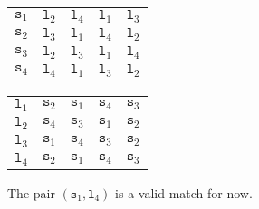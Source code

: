 \documentclass[a4paper, openany]{memoir}
\begin{document}
    \begin{table}[H]
        \centering
        \begin{subtable}{0.45\textwidth}
            \centering
            \begin{tabular}{c|cccc}
                $\texttt{s}_1$ & {\color{blue!60} $\texttt{l}_2$} & \underline{$\texttt{l}_4$} & $\texttt{l}_1$ & $\texttt{l}_3$ \\
                $\texttt{s}_2$ & \underline{$\texttt{l}_3$} & $\texttt{l}_1$ & $\texttt{l}_4$ & $\texttt{l}_2$ \\
                $\texttt{s}_3$ & \underline{$\texttt{l}_2$} & $\texttt{l}_3$ & $\texttt{l}_1$ & $\texttt{l}_4$ \\
                $\texttt{s}_4$ & $\texttt{l}_4$ & $\texttt{l}_1$ & $\texttt{l}_3$ & $\texttt{l}_2$
            \end{tabular}
        \end{subtable}
        \hfill
        \begin{subtable}{0.45\textwidth}
            \centering
            \begin{tabular}{c|cccc}
                $\texttt{l}_1$ & $\texttt{s}_2$ & $\texttt{s}_1$ & $\texttt{s}_4$ & $\texttt{s}_3$ \\
                $\texttt{l}_2$ & $\texttt{s}_4$ & \underline{$\texttt{s}_3$} & $\texttt{s}_1$ & $\texttt{s}_2$ \\
                $\texttt{l}_3$ & $\texttt{s}_1$ & $\texttt{s}_4$ & $\texttt{s}_3$ & \underline{$\texttt{s}_2$} \\
                $\texttt{l}_4$ & $\texttt{s}_2$ & \underline{$\texttt{s}_1$} & $\texttt{s}_4$ & $\texttt{s}_3$
            \end{tabular}
        \end{subtable}
    \end{table}
    \noindent The pair $(\texttt{s}_1, \texttt{l}_4)$ is a valid match for now.
\end{document}
